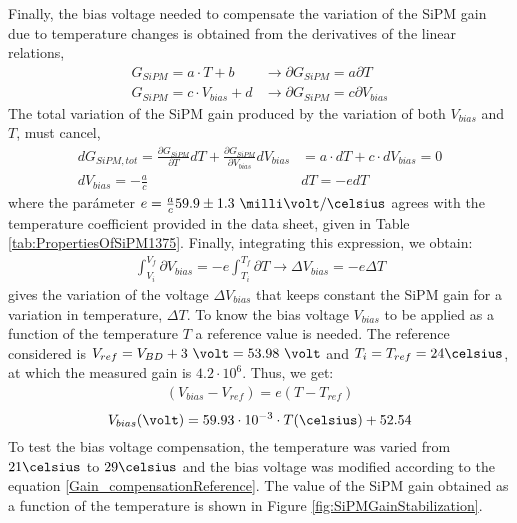 Finally, the bias voltage needed to compensate the variation of the SiPM gain due to temperature changes is obtained from the derivatives of the linear relations,
\begin{equation*}
\begin{split}
G_{SiPM}=a \cdot{} T + b  &\longrightarrow \partial G_{SiPM}= a \partial T\\
G_{SiPM}=c \cdot{} V_{bias} + d &\longrightarrow \partial G_{SiPM}= c \partial V_{bias}
\label{Gain_compensationVariations}
\end{split}
\end{equation*} 
The total variation of the SiPM gain produced by the variation of both $V_{bias}$ and $T$, must cancel,
\begin{equation*}
\begin{split}
d G_{SiPM, tot}= \frac{\partial G_{SiPM}}{\partial T} dT + \frac{\partial G_{SiPM}}{\partial V_{bias}} dV_{bias}& = a \cdot{} dT + c \cdot{} dV_{bias} = 0\\ 
dV_{bias}  = - \frac{a}{c}& dT = - e dT
\label{Gain_compensation0}
\end{split}
\end{equation*} 
where the parámeter $e= \frac{a}{c} 59.9 \pm 1.3~\milli\volt/\celsius $ agrees with the temperature coefficient provided in the data sheet, given in Table \ref{tab:PropertiesOfSiPM1375}. Finally, integrating this expression, we obtain:
\begin{equation}
\begin{split}
\int_{V_i}^{V_f}\partial V_{bias}  = -e\int_{T_i}^{T_f}\partial T \longrightarrow \Delta V_{bias} = -e \Delta T
\label{Gain_compensationIntegring}
\end{split}
\end{equation} 
gives the variation of the voltage $\Delta V_{bias}$ that keeps constant the SiPM gain for a variation in temperature, $\Delta T$. To know the bias voltage $V_{bias}$ to be applied as a function of the temperature $T$ a reference value is needed. The reference considered is $V_{ref}= V_{BD}+3~\volt = 53.98~\volt$ and $T_i=T_{ref}=24\celsius$, at which the measured gain is $4.2 \cdot{} 10^{6}$. Thus, we get:
\begin{equation*}
\begin{split}
(V_{bias}-V_{ref} )= e \left( T -T_{ref} \right) 
\label{Gain_compensationEquation}
\end{split}
\end{equation*}
\begin{equation}
V_{bias}(\volt)= 59.93 \cdot{} 10^{-3} \cdot{} T(\celsius) + 52.54
\label{Gain_compensationReference}
\end{equation}  
To test the bias voltage compensation, the temperature was varied from $21\celsius$ to $29\celsius$ and the bias voltage was modified according to the equation \ref{Gain_compensationReference}. The value of the SiPM gain obtained as a function of the temperature is shown in Figure \ref{fig:SiPMGainStabilization}.

